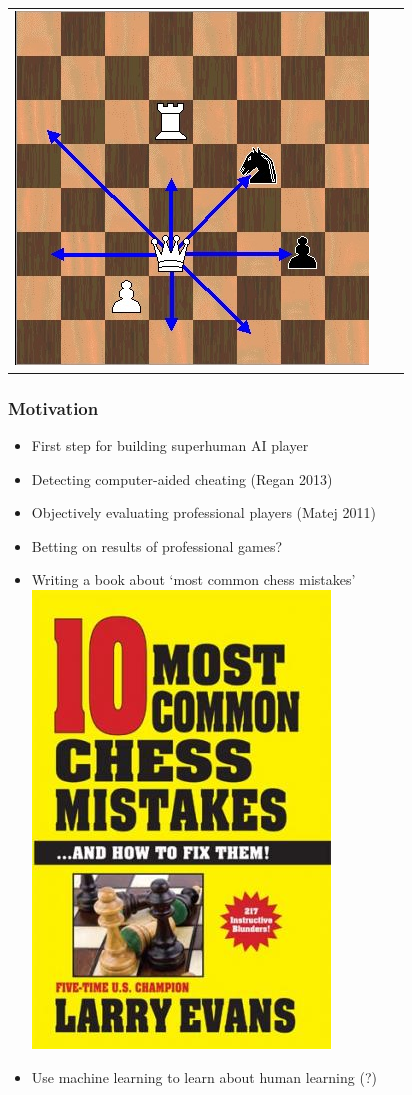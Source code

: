 \documentclass{beamer}
\begin{document}
\begin{frame}
\begin{tabular}{ccc}
\includegraphics[scale = 0.2]{Queenmoves3.jpg}
\end{tabular}
\end{frame}

\begin{frame}
\frametitle{Motivation}
\begin{itemize}
\item First step for building superhuman AI player
\item Detecting computer-aided cheating (Regan 2013)
\item Objectively evaluating professional players (Matej 2011)
\item Betting on results of professional games?
\item Writing a book about `most common chess mistakes' \includegraphics[scale = 0.2]{chess_mistakes.jpg}
\item Use machine learning to learn about human learning (?)
\end{itemize}
\end{frame}
\end{document}
